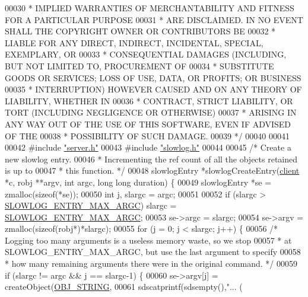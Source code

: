 \begin{DoxyCode}
00030 \textcolor{comment}{ * IMPLIED WARRANTIES OF MERCHANTABILITY AND FITNESS FOR A PARTICULAR PURPOSE}
00031 \textcolor{comment}{ * ARE DISCLAIMED. IN NO EVENT SHALL THE COPYRIGHT OWNER OR CONTRIBUTORS BE}
00032 \textcolor{comment}{ * LIABLE FOR ANY DIRECT, INDIRECT, INCIDENTAL, SPECIAL, EXEMPLARY, OR}
00033 \textcolor{comment}{ * CONSEQUENTIAL DAMAGES (INCLUDING, BUT NOT LIMITED TO, PROCUREMENT OF}
00034 \textcolor{comment}{ * SUBSTITUTE GOODS OR SERVICES; LOSS OF USE, DATA, OR PROFITS; OR BUSINESS}
00035 \textcolor{comment}{ * INTERRUPTION) HOWEVER CAUSED AND ON ANY THEORY OF LIABILITY, WHETHER IN}
00036 \textcolor{comment}{ * CONTRACT, STRICT LIABILITY, OR TORT (INCLUDING NEGLIGENCE OR OTHERWISE)}
00037 \textcolor{comment}{ * ARISING IN ANY WAY OUT OF THE USE OF THIS SOFTWARE, EVEN IF ADVISED OF THE}
00038 \textcolor{comment}{ * POSSIBILITY OF SUCH DAMAGE.}
00039 \textcolor{comment}{ */}
00040 
00041 
00042 \textcolor{preprocessor}{#}\textcolor{preprocessor}{include} \hyperlink{server_8h}{"server.h"}
00043 \textcolor{preprocessor}{#}\textcolor{preprocessor}{include} \hyperlink{slowlog_8h}{"slowlog.h"}
00044 
00045 \textcolor{comment}{/* Create a new slowlog entry.}
00046 \textcolor{comment}{ * Incrementing the ref count of all the objects retained is up to}
00047 \textcolor{comment}{ * this function. */}
00048 slowlogEntry *slowlogCreateEntry(\hyperlink{structclient}{client} *c, robj **argv, \textcolor{keywordtype}{int} argc, \textcolor{keywordtype}{long} \textcolor{keywordtype}{long} duration) \{
00049     slowlogEntry *se = zmalloc(\textcolor{keyword}{sizeof}(*se));
00050     \textcolor{keywordtype}{int} j, slargc = argc;
00051 
00052     \textcolor{keywordflow}{if} (slargc > \hyperlink{slowlog_8h_a0b9eefa88302f670eaec2f86a71900f7}{SLOWLOG\_ENTRY\_MAX\_ARGC}) slargc = 
      \hyperlink{slowlog_8h_a0b9eefa88302f670eaec2f86a71900f7}{SLOWLOG\_ENTRY\_MAX\_ARGC};
00053     se->argc = slargc;
00054     se->argv = zmalloc(\textcolor{keyword}{sizeof}(robj*)*slargc);
00055     \textcolor{keywordflow}{for} (j = 0; j < slargc; j++) \{
00056         \textcolor{comment}{/* Logging too many arguments is a useless memory waste, so we stop}
00057 \textcolor{comment}{         * at SLOWLOG\_ENTRY\_MAX\_ARGC, but use the last argument to specify}
00058 \textcolor{comment}{         * how many remaining arguments there were in the original command. */}
00059         \textcolor{keywordflow}{if} (slargc != argc && j == slargc-1) \{
00060             se->argv[j] = createObject(\hyperlink{server_8h_a65236ea160f69cdef33ec942092af88f}{OBJ\_STRING},
00061                 sdscatprintf(sdsempty(),\textcolor{stringliteral}{"... (%
}
\end{DoxyCode}
